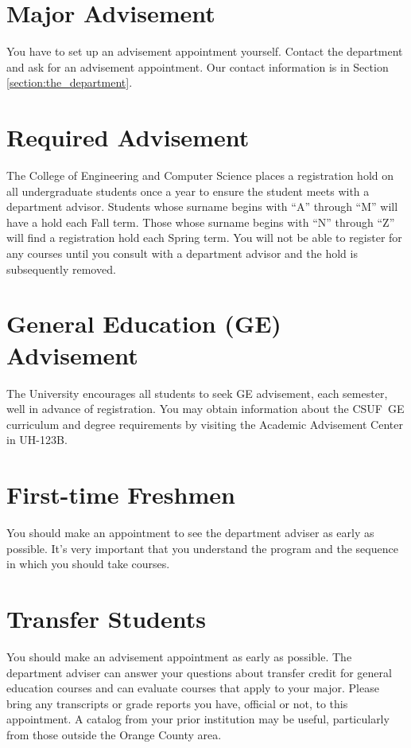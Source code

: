 \documentclass{book}
\newcommand{\CampusName}{CSUF}
\begin{document}
\section{Major Advisement}
You have to set up an advisement appointment yourself. Contact the department and ask for an advisement appointment. Our contact information is in Section \ref{section:the_department}.

\section{Required Advisement}
The College of Engineering and Computer Science places a registration hold on
all undergraduate students once a year to ensure the student meets with a
department advisor. Students whose surname begins with ``A'' through ``M'' will
have a hold each Fall term. Those whose surname begins with ``N'' through
``Z'' will find a registration hold each Spring term.  You will not be able to
register for any courses until you consult with a department advisor and the
hold is subsequently removed.

\section{General Education (GE) Advisement}
 
The University encourages all students to seek GE advisement, each semester, well in advance of registration.  You may obtain information about the \CampusName~GE curriculum and degree requirements by visiting the Academic Advisement Center in UH-123B.

\section{First-time Freshmen}
You should make an appointment to see the department adviser as early as possible. It's very important that you understand the program and the sequence in which you should take courses.

\section{Transfer Students}
You should make an advisement appointment as early as possible. The department adviser can answer your questions about transfer credit for general education courses and can evaluate courses that apply to your major. Please bring any transcripts or grade reports you have, official or not, to this appointment. A catalog from your prior institution may be useful, particularly from those outside the Orange County area.
\end{document}
